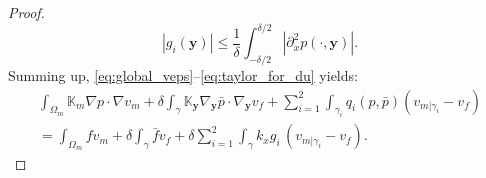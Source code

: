 \documentclass{llncs}
\def\vc#1{\mathbf{\boldsymbol{#1}}}     %
\def\tn#1{{\mathbb{#1}}}    %
\def\yy{{\vc y}}
\begin{document}
\begin{proof}
\begin{equation}
\label{eq:estimate_gi}
|g_i(\vc y)| \le \frac1\delta\int_{-\delta/2}^{\delta/2} |\partial_x^2 p(\cdot,\vc y)|.
\end{equation}
Summing up, \eqref{eq:global_veps}--\eqref{eq:taylor_for_du} yields:
\begin{multline}
\label{eq:sum_global_vk_limit}
\int_{\Omega_m}\tn K_m\nabla p\cdot\nabla v_m
+\delta\int_\gamma\tn K_\yy\nabla_\yy\bar p\cdot\nabla_\yy v_f
+ \sum_{i=1}^2\int_{\gamma_i} q_i(p,\bar p) (v_{m|\gamma_i} - v_f)\\
= \int_{\Omega_m} f v_m
+ \delta\int_{\gamma} \bar f v_f
+ \delta\sum_{i=1}^2\int_\gamma k_x g_i\, (v_{m|\gamma_i} - v_f).
\end{multline}


\end{proof}
\end{document}
